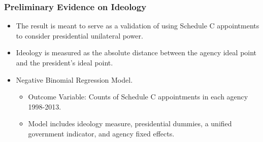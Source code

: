 \documentclass{beamer}
\begin{document}
\begin{frame}
\frametitle{Preliminary Evidence on Ideology}

\begin{itemize}\addtolength{\itemsep}{1.5\baselineskip}
\item The result is meant to serve as a validation of using Schedule C appointments to consider presidential unilateral power. 
\item Ideology is measured as the absolute distance between the agency ideal point and the president's ideal point.
\item Negative Binomial Regression Model.
\begin{itemize}\addtolength{\itemsep}{1\baselineskip}
\item Outcome Variable: Counts of Schedule C appointments in each agency 1998-2013.
\item Model includes ideology measure, presidential dummies, a unified government indicator, and agency fixed effects.
\end{itemize}
\end{itemize}
\end{frame}
\end{document}
